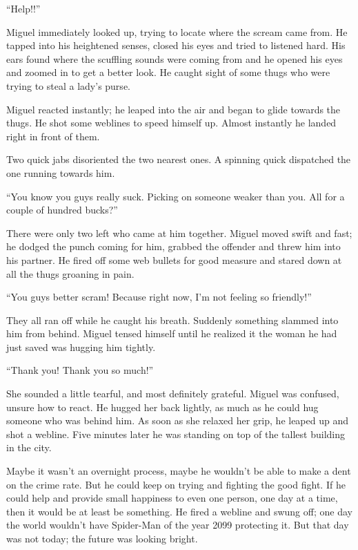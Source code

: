 “Help!!”

Miguel immediately looked up, trying to locate where the scream came from. He tapped into his heightened senses, closed his eyes and tried to listened hard. His ears found where the scuffling sounds were coming from and he opened his eyes and zoomed in to get a better look. He caught sight of some thugs who were trying to steal a lady’s purse.

Miguel reacted instantly; he leaped into the air and began to glide towards the thugs. He shot some weblines to speed himself up. Almost instantly he landed right in front of them.

Two quick jabs disoriented the two nearest ones. A spinning quick dispatched the one running towards him.

“You know you guys really suck. Picking on someone weaker than you. All for a couple of hundred bucks?”

There were only two left who came at him together. Miguel moved swift and fast; he dodged the punch coming for him, grabbed the offender and threw him into his partner. He fired off some web bullets for good measure and stared down at all the thugs groaning in pain.

“You guys better scram! Because right now, I’m not feeling so friendly!”

They all ran off while he caught his breath. Suddenly something slammed into him from behind. Miguel tensed himself until he realized it the woman he had just saved was hugging him tightly. 

“Thank you! Thank you so much!”

She sounded a little tearful, and most definitely grateful. Miguel was confused, unsure how to react. He hugged her back lightly, as much as he could hug someone who was behind him. As soon as she relaxed her grip, he leaped up and shot a webline. Five minutes later he was standing on top of the tallest building in the city.

Maybe it wasn’t an overnight process, maybe he wouldn’t be able to make a dent on the crime rate. But he could keep on trying and fighting the good fight. If he could help and provide small happiness to even one person, one day at a time, then it would be at least be something. He fired a webline and swung off; one day the world wouldn’t have Spider-Man of the year 2099 protecting it. But that day was not today; the future was looking bright. 




